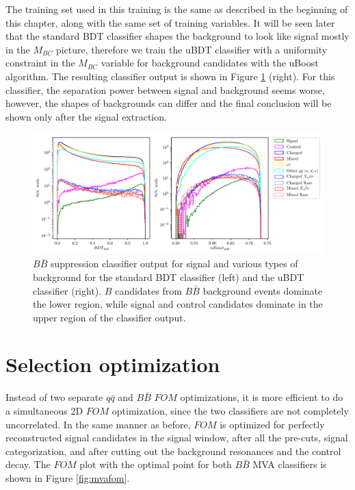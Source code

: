 \documentclass[headings=standardclasses,headings=big,oneside,a4paper,openany,12pt]{scrbook}
\begin{document}
The training set used in this training is the same as described in the beginning of this chapter, along with the same set of training variables. It will be seen later that the standard BDT classifier shapes the background to look like signal mostly in the $M_{BC}$ picture, therefore we train the uBDT classifier with a uniformity constraint in the $M_{BC}$ variable for background candidates with the uBoost algorithm. The resulting classifier output is shown in Figure \ref{fig:bbmva} (right). For this classifier, the separation power between signal and background seems worse, however, the shapes of backgrounds can differ and the final conclusion will be shown only after the signal extraction.

\begin{figure}[H]
\centering
\captionsetup{width=0.8\linewidth}
\includegraphics[width=\linewidth]{fig/bb_BDT}
\caption{$B\bar B$ suppression classifier output for signal and various types of background for the standard BDT classifier (left) and the uBDT classifier (right). $B$ candidates from $B\bar B$ background events dominate the lower region, while signal and control candidates dominate in the upper region of the classifier output.}
\label{fig:bbmva}
\end{figure}

\section{Selection optimization}

Instead of two separate $q \bar q$ and $B \bar B$ $FOM$ optimizations, it is more efficient to do a simultaneous 2D $FOM$ optimization, since the two classifiers are not completely uncorrelated. In the same manner as before, $FOM$ is optimized for perfectly reconstructed signal candidates in the signal window, after all the pre-cuts, signal categorization, and after cutting out the background resonances and the control decay. The $FOM$ plot with the optimal point for both $B \bar B$ MVA classifiers is shown in Figure \ref{fig:mvafom}.
\end{document}
